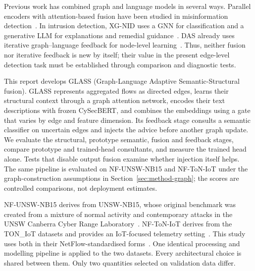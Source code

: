 Previous work has combined graph and language models in several ways. Parallel encoders with attention-based fusion have been studied in misinformation detection~\citep{moorthy2025dualstream}. In intrusion detection, XG-NID uses a GNN for classification and a generative LLM for explanations and remedial guidance~\citep{farrukh2025xgnid}. DAS already uses iterative graph--language feedback for node-level learning~\citep{thapaliya2025das}. Thus, neither fusion nor iterative feedback is new by itself; their value in the present edge-level detection task must be established through comparison and diagnostic tests.

This report develops GLASS (Graph-Language Adaptive Semantic-Structural fusion). GLASS represents aggregated flows as directed edges, learns their structural context through a graph attention network, encodes their text descriptions with frozen CySecBERT, and combines the embeddings using a gate that varies by edge and feature dimension. Its feedback stage consults a semantic classifier on uncertain edges and injects the advice before another graph update. We evaluate the structural, prototype semantic, fusion and feedback stages, compare prototype and trained-head consultants, and measure the trained head alone. Tests that disable output fusion examine whether injection itself helps. The same pipeline is evaluated on NF-UNSW-NB15 and NF-ToN-IoT under the graph-construction assumptions in Section~\ref{sec:method-graph}; the scores are controlled comparisons, not deployment estimates.

NF-UNSW-NB15 derives from UNSW-NB15, whose original benchmark was created from a mixture
of normal activity and contemporary attacks in the UNSW Canberra Cyber Range
Laboratory~\citep{moustafa2015unsw}. NF-ToN-IoT derives from the TON\_IoT datasets and
provides an IoT-focused telemetry setting~\citep{moustafa2021toniot}. This study uses both
in their NetFlow-standardised forms~\citep{sarhan2021netflow}. One identical processing
and modelling pipeline is applied to the two datasets. Every architectural choice is
shared between them. Only two quantities selected on validation data differ.

